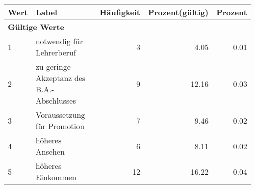      \begin{longtable}{lXrrr}
     \toprule
     \textbf{Wert} & \textbf{Label} & \textbf{Häufigkeit} & \textbf{Prozent(gültig)} & \textbf{Prozent} \\
     \endhead
     \midrule
     \multicolumn{5}{l}{\textbf{Gültige Werte}}\\

     1 &
     \multicolumn{1}{X}{ notwendig für Lehrerberuf   } &


       \num{3} &
       \num[round-mode=places,round-precision=2]{4,05} &
         \num[round-mode=places,round-precision=2]{0,01} \\

     2 &
     \multicolumn{1}{X}{ zu geringe Akzeptanz des B.A.-Abschlusses   } &


       \num{9} &
       \num[round-mode=places,round-precision=2]{12,16} &
         \num[round-mode=places,round-precision=2]{0,03} \\

     3 &
     \multicolumn{1}{X}{ Voraussetzung für Promotion   } &


       \num{7} &
       \num[round-mode=places,round-precision=2]{9,46} &
         \num[round-mode=places,round-precision=2]{0,02} \\

     4 &
     \multicolumn{1}{X}{ höheres Ansehen   } &


       \num{6} &
       \num[round-mode=places,round-precision=2]{8,11} &
         \num[round-mode=places,round-precision=2]{0,02} \\

     5 &
     \multicolumn{1}{X}{ höheres Einkommen   } &


       \num{12} &
       \num[round-mode=places,round-precision=2]{16,22} &
         \num[round-mode=places,round-precision=2]{0,04} \\


\end{longtable}
